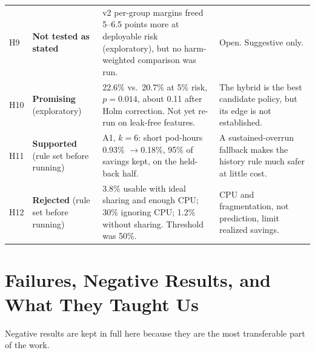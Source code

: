 \documentclass[11pt]{article}
\newcommand{\ra}{$\rightarrow$}
\begin{document}
\begin{longtable}{@{}P{0.8cm}P{2.5cm}P{6.8cm}P{5.1cm}@{}}
H9 & \textbf{Not tested as stated} & v2 per-group margins freed 5--6.5 points more at deployable risk (exploratory), but no harm-weighted comparison was run. & Open. Suggestive only. \\
H10 & \textbf{Promising} (exploratory) & 22.6\% vs.\ 20.7\% at 5\% risk, $p = 0.014$, about 0.11 after Holm correction. Not yet re-run on leak-free features. & The hybrid is the best candidate policy, but its edge is not established. \\
H11 & \textbf{Supported} (rule set before running) & A1, $k=6$: short pod-hours 0.93\% \ra 0.18\%, 95\% of savings kept, on the held-back half. & A sustained-overrun fallback makes the history rule much safer at little cost. \\
H12 & \textbf{Rejected} (rule set before running) & 3.8\% usable with ideal sharing and enough CPU; 30\% ignoring CPU; 1.2\% without sharing. Threshold was 50\%. & CPU and fragmentation, not prediction, limit realized savings. \\
\bottomrule
\end{longtable}

\section{Failures, Negative Results, and What They Taught Us}
\label{sec:failures}

Negative results are kept in full here because they are the most transferable part of the work.
\end{document}
